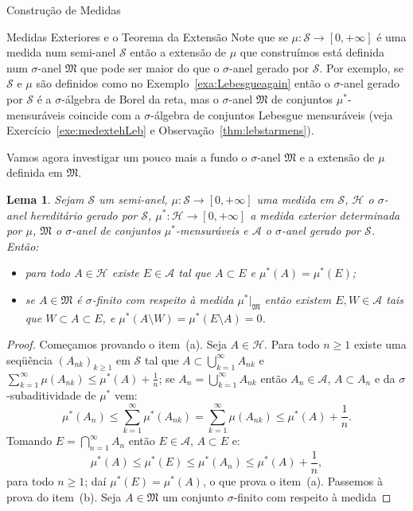 \documentclass[oneside,final,11pt]{amsbook}
\theoremstyle{remark}\newtheorem{exercise}{Exercício}[chapter]
\theoremstyle{remark}\newtheorem{*exercise}[exercise]{\hbox to 0pt{\hskip 0pt minus 1fil*}Exercício}
\theoremstyle{definition}\newtheorem{exdefin}{Definição}[chapter]
\theoremstyle{plain}\newtheorem{teo}{Teorema}[section]
\theoremstyle{plain}\newtheorem{lem}[teo]{Lema}
\theoremstyle{plain}\newtheorem{prop}[teo]{Proposição}
\theoremstyle{plain}\newtheorem{cor}[teo]{Corolário}
\theoremstyle{definition}\newtheorem{defin}[teo]{Definição}
\theoremstyle{remark}\newtheorem{rem}[teo]{Observação}
\theoremstyle{definition}\newtheorem{notation}[teo]{Notação}
\theoremstyle{definition}\newtheorem{convention}[teo]{Convenção}
\theoremstyle{definition}\newtheorem{example}[teo]{Exemplo}
\numberwithin{section}{chapter}
\numberwithin{equation}{section}
\begin{document}
\begin{chapter}{Construção de Medidas}
\begin{section}{Medidas Exteriores e o Teorema da Extensão}
Note que se $\mu:\mathcal S\to[0,+\infty]$ é uma medida num semi-anel $\mathcal S$ então
a extensão de $\mu$ que construímos está definida num $\sigma$-anel $\mathfrak M$ que
pode ser maior do que o $\sigma$-anel gerado por $\mathcal S$. Por exemplo,
se $\mathcal S$ e $\mu$ são definidos como no Exemplo~\ref{exa:Lebesgueagain} então
o $\sigma$-anel gerado por $\mathcal S$ é a $\sigma$-álgebra
de Borel da reta, mas o $\sigma$-anel $\mathfrak M$ de conjuntos
$\mu^*$-mensuráveis coincide com a $\sigma$-álgebra de conjuntos Lebesgue mensuráveis
(veja Exercício~\ref{exe:medextehLeb} e Observação~\ref{thm:lebstarmens}).

Vamos agora investigar um pouco mais a fundo o $\sigma$-anel $\mathfrak M$ e a extensão de
$\mu$ definida em $\mathfrak M$.

\begin{lem}\label{thm:geralenvelopes}
Sejam $\mathcal S$ um semi-anel, $\mu:\mathcal S\to[0,+\infty]$ uma medida em $\mathcal S$,
$\mathcal H$ o $\sigma$-anel hereditário gerado por $\mathcal S$, $\mu^*:\mathcal H\to[0,+\infty]$
a medida exterior determinada por $\mu$, $\mathfrak M$ o $\sigma$-anel
de conjuntos $\mu^*$-mensuráveis e $\mathcal A$ o $\sigma$-anel gerado por $\mathcal S$.
Então:
\begin{itemize}
\item[(a)] para todo $A\in\mathcal H$ existe $E\in\mathcal A$ tal que
$A\subset E$ e $\mu^*(A)=\mu^*(E)$;
\item[(b)] se $A\in\mathfrak M$ é $\sigma$-finito com respeito à medida $\mu^*\vert_{\mathfrak M}$
então existem $E,W\in\mathcal A$ tais que $W\subset A\subset E$,
e $\mu^*(A\setminus W)=\mu^*(E\setminus A)=0$.
\end{itemize}
\end{lem}
\begin{proof}
Começamos provando o item~(a). Seja $A\in\mathcal H$. Para todo $n\ge1$ existe
uma seqüência $(A_{nk})_{k\ge1}$ em $\mathcal S$ tal que $A\subset\bigcup_{k=1}^\infty A_{nk}$
e $\sum_{k=1}^\infty\mu(A_{nk})\le\mu^*(A)+\frac1n$; se $A_n=\bigcup_{k=1}^\infty A_{nk}$
então $A_n\in\mathcal A$, $A\subset A_n$ e da $\sigma$-subaditividade de $\mu^*$ vem:
\[\mu^*(A_n)\le\sum_{k=1}^\infty\mu^*(A_{nk})=\sum_{k=1}^\infty\mu(A_{nk})\le\mu^*(A)+\frac1n.\]
Tomando $E=\bigcap_{n=1}^\infty A_n$ então $E\in\mathcal A$, $A\subset E$ e:
\[\mu^*(A)\le\mu^*(E)\le\mu^*(A_n)\le\mu^*(A)+\frac1n,\]
para todo $n\ge1$; daí $\mu^*(E)=\mu^*(A)$, o que prova o item~(a). Passemos à prova
do item~(b). Seja $A\in\mathfrak M$ um conjunto $\sigma$-finito com respeito à medida

\end{proof}
\end{section}
\end{chapter}
\end{document}
